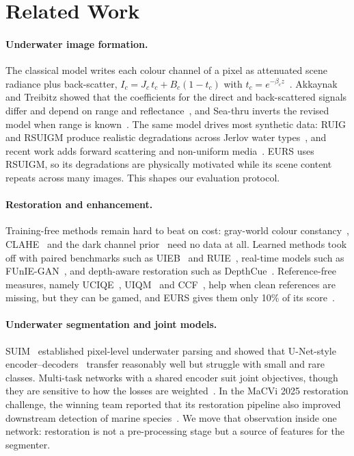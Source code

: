 \documentclass[10pt,twocolumn,letterpaper]{article}
\begin{document}
\section{Related Work}
\paragraph{Underwater image formation.}
The classical model writes each colour channel of a pixel as attenuated scene radiance plus back-scatter,
$I_c=J_c\,t_c+B_c(1-t_c)$ with $t_c=e^{-\beta_c z}$~\cite{jaffe1990computer,mcglamery1980computer}. Akkaynak
and Treibitz showed that the coefficients for the direct and back-scattered signals differ and depend on
range and reflectance~\cite{akkaynak2018revised}, and Sea-thru inverts the revised model when range is
known~\cite{akkaynak2019seathru}. The same model drives most synthetic data: RUIG and RSUIGM produce realistic
degradations across Jerlov water types~\cite{desai2021ruig,desai2024rsuigm}, and recent work adds forward
scattering and non-uniform media~\cite{ismiroglou2025seaing}. EURS uses RSUIGM, so its degradations are
physically motivated while its scene content repeats across many images. This shapes our evaluation
protocol.

\paragraph{Restoration and enhancement.}
Training-free methods remain hard to beat on cost: gray-world colour constancy~\cite{buchsbaum1980spatial},
CLAHE~\cite{zuiderveld1994clahe} and the dark channel prior~\cite{he2011dark} need no data at all. Learned methods
took off with paired benchmarks such as UIEB~\cite{li2020uieb} and RUIE~\cite{liu2020ruie}, real-time models
such as FUnIE-GAN~\cite{islam2020funie}, and depth-aware restoration such as DepthCue~\cite{desai2023depthcue}.
Reference-free measures, namely UCIQE~\cite{yang2015uciqe}, UIQM~\cite{panetta2016uiqm} and CCF~\cite{wang2018ccf},
help when clean references are missing, but they can be gamed, and EURS gives them only 10\% of its
score~\cite{eurs2027challenge}.

\paragraph{Underwater segmentation and joint models.}
SUIM~\cite{islam2020suim} established pixel-level underwater parsing and showed that U-Net-style
encoder--decoders~\cite{ronneberger2015unet} transfer reasonably well but struggle with small and rare classes.
Multi-task networks with a shared encoder suit joint objectives, though they are sensitive to how the losses
are weighted~\cite{kendall2018multitask}. In the MaCVi 2025 restoration challenge, the winning team reported
that its restoration pipeline also improved downstream detection of marine species~\cite{kiefer2025macvi}. We
move that observation inside one network: restoration is not a pre-processing stage but a source of features
for the segmenter.
\end{document}
